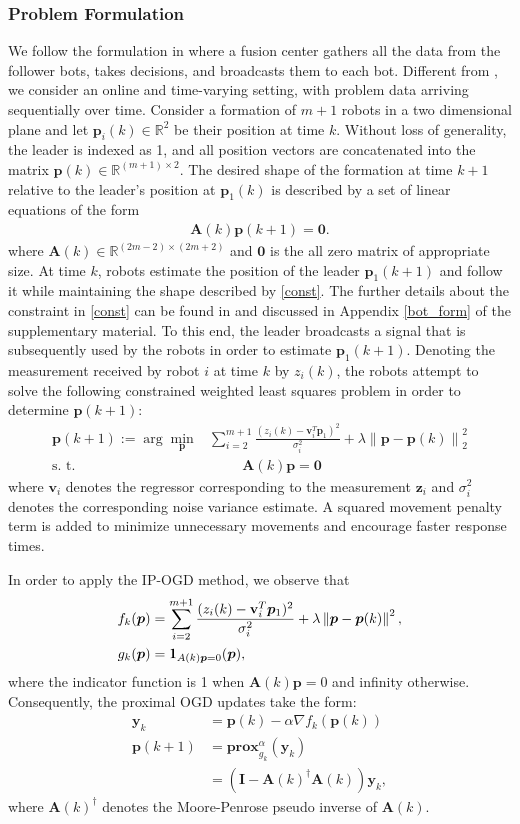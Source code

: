 \documentclass[draftcls,onecolumn,12pt]{IEEEtran}
\theoremstyle{plain}
\def\v{\mathbf{v}}
\def\y{\mathbf{y}}
\def\Rn{\mathbb{R}}
\def\A{\mathbf{A}}
\def\z{\mathbf{z}}
\def\p{\boldsymbol{p}}
\def\prox{\textbf{prox}}
\providecommand{\norm}[1]{\left\|#1\right\|}
\newcommand{\ind}{1\hspace{-1.6mm}1}
\theoremstyle{plain}
\theoremstyle{remark}
\begin{document}
\subsubsection{Problem Formulation}
We follow the formulation in \cite{derenick2007convex} where a fusion center gathers all the data from the follower bots, takes decisions, and broadcasts them to each bot. Different from \cite{derenick2007convex}, we consider an online and time-varying setting, with problem data arriving sequentially over time. Consider a formation of $m+1$ robots in a two dimensional plane and let $\p_i(k) \in \Rn^2$ be their position at time $k$. Without loss of generality, the leader is indexed as 1, and all position vectors are concatenated into the matrix $\p(k) \in \Rn^{(m+1) \times 2}$. The desired shape of the formation at time $k+1$ relative to the leader's position at $\p_1(k)$ is described by a set of linear equations of the form
\begin{align}\label{const}
\A(k) \p(k+1) = \textbf{0}.
\end{align}
where $\A(k) \in \Rn^{(2m-2) \times (2m+2)}$ and $\textbf{0}$ is the all zero matrix of appropriate size. At time $k$,  robots estimate the position of the leader $\p_1(k+1)$ and follow it while maintaining the shape described by \eqref{const}. {The further details about the constraint in \eqref{const} can be found in \cite{derenick2007convex} and discussed in  Appendix \ref{bot_form} of the supplementary material.} To this end, the leader broadcasts a signal that is subsequently used by the robots in order to estimate $\p_{1}(k+1)$. Denoting the measurement received by robot $i$ at time $k$ by $z_i(k)$, the robots attempt to solve the following constrained weighted least squares problem in order to determine $\p(k+1)$:
\begin{align}
\p(k+1):=\arg\min_{\p} &\sum\limits_{i=2}^{m+1} \frac{(z_i(k) - \v_i^T\p_1)^2}{\sigma_i^2}  + \lambda \norm{\p-\p(k)}_2^2 \nonumber\\
\text{s. t.} & \hspace{1cm}\A(k)\p = \textbf{0} \label{botform}
\end{align}
where $\v_i$ denotes the regressor corresponding to the measurement $\z_i$ and $\sigma_i^2$ denotes the corresponding noise variance estimate. A squared movement penalty term is added to minimize unnecessary movements and encourage faster response times. 

In order to apply the IP-OGD method, we observe that
\begin{align}
f_k(\p) &= \sum\limits_{i=2}^{m+1} \frac{(z_i(k) - \v_i^T\p_1)^2}{\sigma_i^2} + \lambda \norm{\p-\p(k)}^2,  \\
g_k(\p) &= \ind_{A(k)\p = 0}(\p),
\end{align}
where the indicator function is 1 when $\A(k)\p = 0$ and infinity otherwise. Consequently, the proximal OGD updates take the form:
\begin{align}
\y_k &= \p(k) - \alpha \nabla f_k(\p(k)) \\
\p(k+1) &= \prox_{g_k}^\alpha(\y_k) \\
&= (\mathbf{I}-\A(k)^{\dagger}\A(k))\y_k,
\end{align}
where $\A(k)^{\dagger}$ denotes the Moore-Penrose pseudo inverse of $\A(k)$. 
\end{document}
